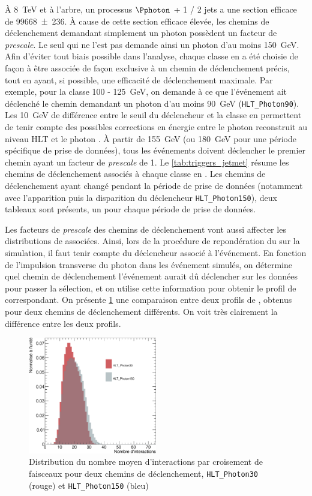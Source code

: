 À \SI{8}{\TeV} et à l'arbre, un processus $\Pphoton$ + 1 / 2 jets a une section efficace de \SI[allow-number-unit-breaks]{99668 \pm 236}{\pb}. À cause de cette section efficace élevée, les chemins de déclenchement demandant simplement un photon possèdent un facteur de \emph{prescale}. Le seul qui ne l'est pas demande ainsi un photon d'au moins \SI{150}{\GeV}. Afin d'éviter tout biais possible dans l'analyse, chaque classe en \ptg{} a été choisie de façon à être associée de façon exclusive à un chemin de déclenchement précis, tout en ayant, si possible, une efficacité de déclenchement maximale. Par exemple, pour la classe 100 - \SI{125}{\GeV}, on demande à ce que l'événement ait déclenché le chemin demandant un photon d'au moins \SI{90}{\GeV} (\texttt{HLT\_Photon90}). Les \SI{10}{\GeV} de différence entre le seuil du déclencheur et la classe en \pt permettent de tenir compte des possibles corrections en énergie entre le photon reconstruit au niveau HLT et le photon \pf. À partir de \SI{155}{\GeV} (ou \SI{180}{\GeV} pour une période spécifique de prise de données), tous les événements doivent déclencher le premier chemin ayant un facteur de \emph{prescale} de 1. Le \cref{tab:triggers_jetmet} résume les chemins de déclenchement associés à chaque classe en \ptg. Les chemins de déclenchement ayant changé pendant la période de prise de données (notamment avec l'apparition puis la disparition du déclencheur \texttt{HLT\_Photon150}), deux tableaux sont présents, un pour chaque période de prise de données.

Les facteurs de \emph{prescale} des chemins de déclenchement vont aussi affecter les distributions de \pu associées. Ainsi, lors de la procédure de repondération du \pu sur la simulation, il faut tenir compte du déclencheur associé à l'événement. En fonction de l'impulsion transverse du photon dans les événement simulés, on détermine quel chemin de déclenchement l'événement aurait dû déclencher sur les données pour passer la sélection, et on utilise cette information pour obtenir le profil de \pu correspondant. On présente \cref{fig:pu_jetmet} une comparaison entre deux profils de \pu, obtenus pour deux chemins de déclenchement différents. On voit très clairement la différence entre les deux profils.

\begin{figure}[tbp]
    \centering
    \includegraphics[width=0.5\textwidth]{chapitre4/figs/pu_plot.pdf}
    \caption{Distribution du nombre moyen d'interactions par croisement de faisceaux pour deux chemins de déclenchement, \texttt{HLT\_Photon30} (rouge) et \texttt{HLT\_Photon150} (bleu)}
    \label{fig:pu_jetmet}
\end{figure}

